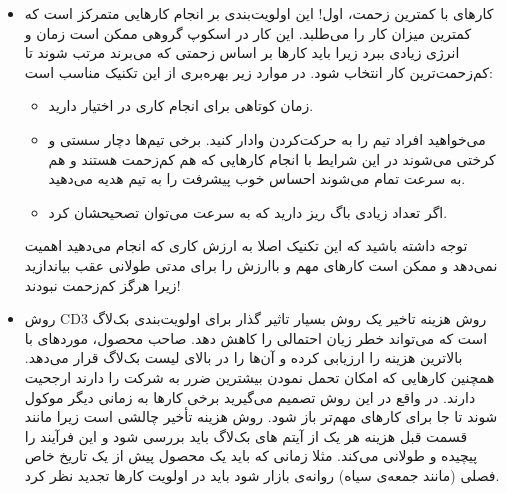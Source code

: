 {\begin{itemize}
    \item کار‌های با کمترین زحمت، اول!
    این اولویت‌بندی بر انجام کارهایی متمرکز است که کمترین میزان کار را می‌طلبد. این کار در اسکوپ گروهی ممکن است زمان و انرژی زیادی ببرد زیرا باید کارها بر اساس زحمتی که می‌برند مرتب شوند تا کم‌زحمت‌ترین کار انتخاب شود. در موارد زیر بهره‌بری از این تکنیک مناسب است:
    \begin{itemize}
        \item زمان کوتاهی برای انجام کاری در اختیار دارید.
        \item می‌خواهید افراد تیم را به حرکت‌کردن وادار کنید. برخی تیم‌ها دچار سستی و کرختی می‌شوند در این شرایط با انجام کارهایی که هم کم‌زحمت هستند و هم به سرعت تمام می‌شوند احساس خوب پیشرفت را به تیم هدیه می‌دهید.
        \item اگر تعداد زیادی باگ ریز دارید که به سرعت می‌توان تصحیحشان کرد.
    \end{itemize}
    توجه داشته باشید که این تکنیک اصلا به ارزش کاری که انجام می‌دهید اهمیت نمی‌دهد و ممکن است کارهای مهم و باارزش را برای مدتی طولانی عقب بیاندازید زیرا هرگز کم‌زحمت نبودند!

    \item روش CD3
    روش هزینه تاخیر یک روش بسیار تاثیر گذار برای اولویت‌بندی بک‌لاگ است که می‌تواند خطر زیان احتمالی را کاهش دهد. صاحب محصول، مورد‌های با بالاترین هزینه را ارزیابی کرده و آن‌ها را در بالای لیست بک‌لاگ قرار می‌دهد. همچنین کارهایی که امکان تحمل نمودن بیشترین ضرر به شرکت را دارند ارجحیت دارند. در واقع در این روش تصمیم می‌گیرید برخی کارها به زمانی دیگر موکول شوند تا جا برای کارهای مهم‌تر باز شود. روش هزینه تأخیر چالشی است زیرا مانند قسمت قبل هزینه هر یک از آیتم های بک‌لاگ باید بررسی شود و این فرآیند را پیچیده و طولانی می‌کند. مثلا زمانی که باید یک محصول پیش از یک تاریخ خاص فصلی (مانند جمعه‌ی سیاه) روانه‌ی بازار شود باید در اولویت کارها تجدید نظر کرد.
    

\end{itemize}}
